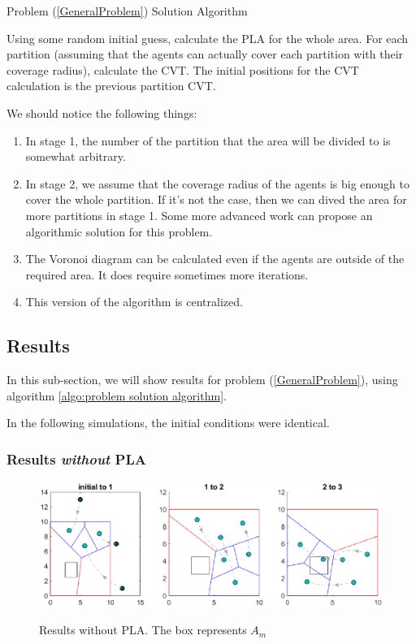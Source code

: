 \documentclass{iacas}
\begin{document}
\begin{algorithm}[H]
\caption{Problem (\ref{GeneralProblem}) Solution Algorithm}\label{GeneralProbSolution}
\begin{algorithmic}[1]
\State Using some random initial guess, calculate the PLA for the whole area.
\State For each partition (assuming that the agents can actually cover each partition with their coverage radius), calculate the CVT. The initial positions for the CVT calculation is the previous partition CVT.
\end{algorithmic}
\label{algo:problem solution algorithm}
\end{algorithm}

We should notice the following things:
\begin{enumerate}
\item In stage 1, the number of the partition that the area will be divided to is somewhat arbitrary.
\item In stage 2, we assume that the coverage radius of the agents is big enough to cover the whole partition. If it's not the case, then we can dived the area for more partitions in stage 1. Some more advanced work can propose an algorithmic solution for this problem.
\item The Voronoi diagram can be calculated even if the agents are outside of the required area. It does require sometimes more iterations.
\item This version of the algorithm is centralized.
\end{enumerate}


\subsection{Results}
In this sub-section, we will show results for problem (\ref{GeneralProblem}), using algorithm \ref{algo:problem solution algorithm}.

In the following simulations, the initial conditions were identical.

\subsubsection{Results \emph{without} PLA}
\begin{figure}[H]
\includegraphics[scale=0.8]{figures/proposed-sol/results/sim1-3agents-3partitions-noPLA.eps}
\label{fig:results:no PLA}
\caption{Results without PLA. The box represents $A_m$}
\end{figure}
\end{document}
